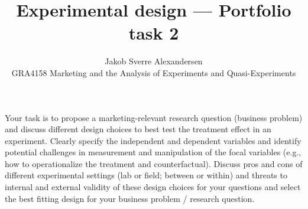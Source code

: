 \documentclass[10pt]{article}
\begin{document}
 
\title{Experimental design --- Portfolio task 2}
\author{Jakob Sverre Alexandersen\\
GRA4158 Marketing and the Analysis of Experiments and Quasi-Experiments}
\maketitle

Your task is to propose a marketing-relevant research question (business problem) and discuss
different design choices to best test the treatment effect in an experiment. Clearly specify the
independent and dependent variables and identify potential challenges in measurement and
manipulation of the focal variables (e.g., how to operationalize the treatment and
counterfactual). Discuss pros and cons of different experimental settings (lab or field; between
or within) and threats to internal and external validity of these design choices for your questions
and select the best fitting design for your business problem / research question.
\end{document}
